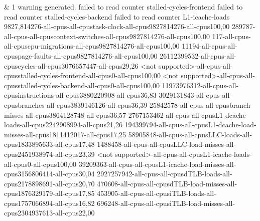 &
1 warning generated. failed to read counter stalled-cycles-frontend failed to read counter stalled-cycles-backend failed to read counter L1-icache-loads 9827,814276-all-cpus-all-cpustask-clock-all-cpus9827814276-all-cpus100,00 289787-all-cpus-all-cpuscontext-switches-all-cpus9827814276-all-cpus100,00 117-all-cpus-all-cpuscpu-migrations-all-cpus9827814276-all-cpus100,00 11194-all-cpus-all-cpuspage-faults-all-cpus9827814276-all-cpus100,00 26112399532-all-cpus-all-cpuscycles-all-cpus3076657447-all-cpus29,26 <not supported>-all-cpus-all-cpusstalled-cycles-frontend-all-cpus0-all-cpus100,00 <not supported>-all-cpus-all-cpusstalled-cycles-backend-all-cpus0-all-cpus100,00 11973976312-all-cpus-all-cpusinstructions-all-cpus3880220908-all-cpus36,83 3029131843-all-cpus-all-cpusbranches-all-cpus3839146126-all-cpus36,39 25842578-all-cpus-all-cpusbranch-misses-all-cpus3864128748-all-cpus36,57 2767153462-all-cpus-all-cpusL1-dcache-loads-all-cpus2242908994-all-cpus21,26 194399794-all-cpus-all-cpusL1-dcache-load-misses-all-cpus1811412017-all-cpus17,25 58905848-all-cpus-all-cpusLLC-loads-all-cpus1833895633-all-cpus17,48 1488458-all-cpus-all-cpusLLC-load-misses-all-cpus2451938974-all-cpus23,39 <not supported>-all-cpus-all-cpusL1-icache-loads-all-cpus0-all-cpus100,00 39209363-all-cpus-all-cpusL1-icache-load-misses-all-cpus3156806414-all-cpus30,04 2927257942-all-cpus-all-cpusdTLB-loads-all-cpus2178898691-all-cpus20,70 470608-all-cpus-all-cpusdTLB-load-misses-all-cpus1876329179-all-cpus17,85 453905-all-cpus-all-cpusiTLB-loads-all-cpus1757066894-all-cpus16,82 696248-all-cpus-all-cpusiTLB-load-misses-all-cpus2304937613-all-cpus22,00
